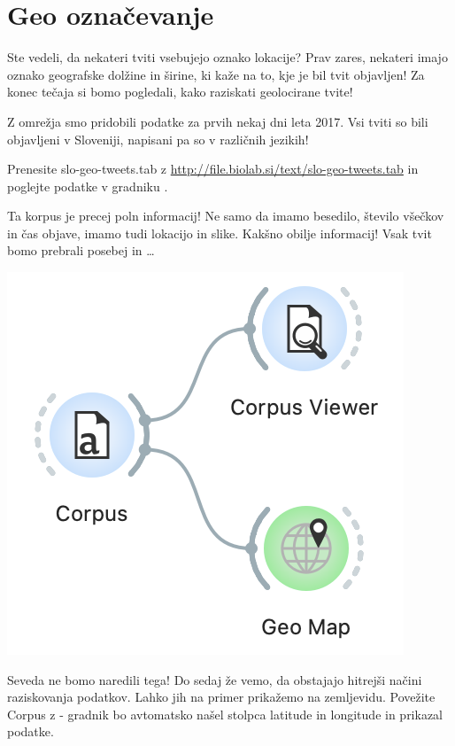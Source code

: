 \chapter{Geo označevanje}
\label{ch:geo-oznacevanje}

Ste vedeli, da nekateri tviti vsebujejo oznako lokacije? Prav zares, nekateri imajo oznako geografske dolžine in širine, ki kaže na to, kje je bil tvit objavljen! Za konec tečaja si bomo pogledali, kako raziskati geolocirane tvite!

Z omrežja smo pridobili podatke za prvih nekaj dni leta 2017. Vsi tviti so bili objavljeni v Sloveniji, napisani pa so v različnih jezikih!

Prenesite slo-geo-tweets.tab z \url{http://file.biolab.si/text/slo-geo-tweets.tab} in poglejte podatke v gradniku .

Ta korpus je precej poln informacij! Ne samo da imamo besedilo, število všečkov in čas objave, imamo tudi lokacijo in slike. Kakšno obilje informacij! Vsak tvit bomo prebrali posebej in …

\begin{marginfigure}[0cm]
    \includegraphics[width=\linewidth]{geo-workflow.png}
    \caption{}
\end{marginfigure}

Seveda ne bomo naredili tega! Do sedaj že vemo, da obstajajo hitrejši načini raziskovanja podatkov. Lahko jih na primer prikažemo na zemljevidu. Povežite Corpus z  - gradnik bo avtomatsko našel stolpca latitude in longitude in prikazal podatke.

